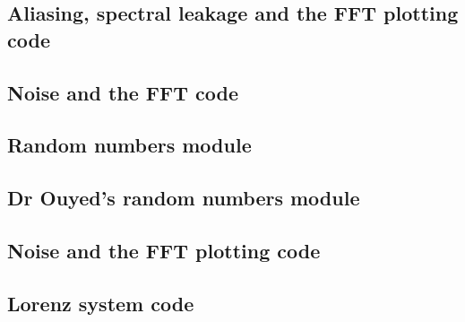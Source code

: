 \documentclass[twocolumn]{myarticle}
\begin{document}
\subsection{Aliasing, spectral leakage and the FFT plotting code}
\label{subsec:aliasing_spectral_leakage_and_the_fft_plotting_code}


\vspace{10pt}

\subsection{Noise and the FFT code}
\label{subsec:noise_and_the_fft_code}


\vspace{10pt}

\subsection{Random numbers module}
\label{subsec:random_numbers_module}


\vspace{10pt}

\subsection{Dr Ouyed's random numbers module}
\label{subsec:dr_ouyeds_random_numbers_module}


\vspace{10pt}

\subsection{Noise and the FFT plotting code}
\label{subsec:noise_and_the_fft_plotting_code}


\vspace{10pt}

\subsection{Lorenz system code}
\label{subsec:lorenz_system_code}


\vspace{10pt}
\end{document}
